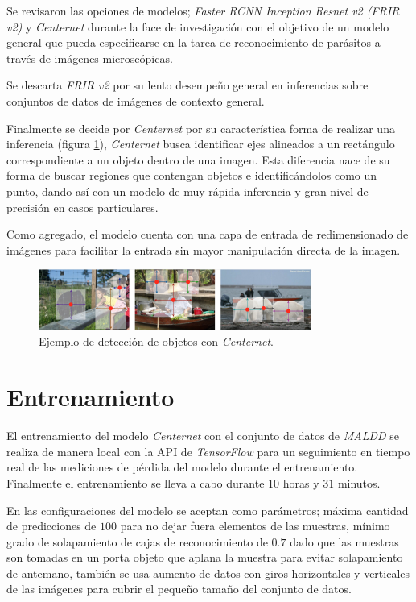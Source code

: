 \documentclass[letter,12pt]{report}
\begin{document}
Se revisaron las opciones de modelos; \textit{Faster RCNN Inception Resnet v2 (FRIR v2)} y
\textit{Centernet} durante la face de investigación con el objetivo de un modelo general que
pueda especificarse en la tarea de reconocimiento de parásitos a través de imágenes
microscópicas.

Se descarta \textit{FRIR v2} por su lento desempeño general en inferencias sobre conjuntos
de datos de imágenes de contexto general.

Finalmente se decide por \textit{Centernet} por su característica forma de realizar una
inferencia (figura \ref{fig:centernet}), \textit{Centernet} busca identificar ejes alineados a un rectángulo
correspondiente a un objeto dentro de una imagen. Esta diferencia nace de su forma de 
buscar regiones que contengan objetos e identificándolos como un punto, dando así con un
modelo de muy rápida inferencia y gran nivel de precisión en casos particulares.

Como agregado, el modelo cuenta con una capa de entrada de redimensionado de imágenes para
facilitar la entrada sin mayor manipulación directa de la imagen.

\begin{figure}[ht]
    \centering
    \includegraphics[width=0.8\textwidth]{centernet}
    \caption{Ejemplo de detección de objetos con \textit{Centernet}.}
    \label{fig:centernet}
\end{figure}

\section{Entrenamiento}
El entrenamiento del modelo \textit{Centernet} con el conjunto de datos de \textit{MALDD} se
realiza de manera local con la API de \textit{TensorFlow} para un seguimiento en tiempo real
de las mediciones de pérdida del modelo durante el entrenamiento. Finalmente el
entrenamiento se lleva a cabo durante $10$ horas y $31$ minutos.

En las configuraciones del modelo se aceptan como parámetros; máxima cantidad de predicciones
de $100$ para no dejar fuera elementos de las muestras, mínimo grado de solapamiento de cajas
de reconocimiento de $0.7$ dado que las muestras son tomadas en un porta objeto que aplana
la muestra para evitar solapamiento de antemano, también se usa aumento de datos con giros
horizontales y verticales de las imágenes para cubrir el pequeño tamaño del conjunto de datos.
\end{document}
